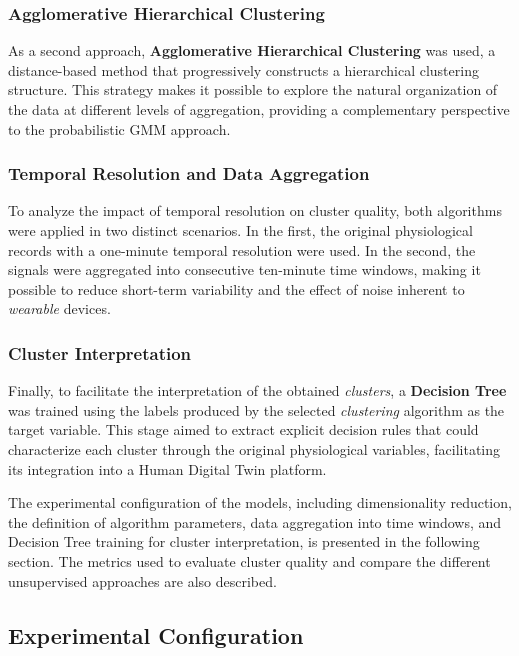 \documentclass[a4paper,fleqn]{cas-sc}
\begin{document}
\subsubsection{Agglomerative Hierarchical Clustering}

As a second approach, \textbf{Agglomerative Hierarchical Clustering} was used, a distance-based method that progressively constructs a hierarchical clustering structure. This strategy makes it possible to explore the natural organization of the data at different levels of aggregation, providing a complementary perspective to the probabilistic GMM approach.

\subsubsection{Temporal Resolution and Data Aggregation}

To analyze the impact of temporal resolution on cluster quality, both algorithms were applied in two distinct scenarios. In the first, the original physiological records with a one-minute temporal resolution were used. In the second, the signals were aggregated into consecutive ten-minute time windows, making it possible to reduce short-term variability and the effect of noise inherent to \textit{wearable} devices.

\subsubsection{Cluster Interpretation}

Finally, to facilitate the interpretation of the obtained \textit{clusters}, a \textbf{Decision Tree} was trained using the labels produced by the selected \textit{clustering} algorithm as the target variable. This stage aimed to extract explicit decision rules that could characterize each cluster through the original physiological variables, facilitating its integration into a Human Digital Twin platform.

\medskip

The experimental configuration of the models, including dimensionality reduction, the definition of algorithm parameters, data aggregation into time windows, and Decision Tree training for cluster interpretation, is presented in the following section. The metrics used to evaluate cluster quality and compare the different unsupervised approaches are also described.

\subsection{Experimental Configuration}
\end{document}

